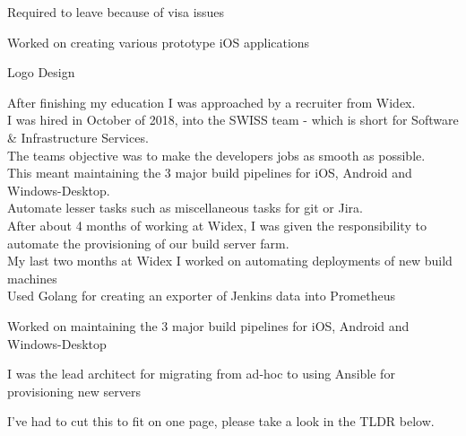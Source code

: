 \documentclass[]{cv}
\begin{document}
\begin{minipage}[t]{0.66\textwidth}
\vspace{\topsep} %
\begin{tightemize}
	\item Required to leave because of visa issues
	\item Worked on creating various prototype iOS applications
	\item Logo Design
\end{tightemize}
\sectionsep


After finishing my education I was approached by a recruiter from Widex. \\
I was hired in October of 2018, into the SWISS team - which is short for Software \& Infrastructure Services. \\
The teams objective was to make the developers jobs as smooth as possible. \\
This meant maintaining the 3 major build pipelines for iOS, Android and Windows-Desktop. \\
Automate lesser tasks such as miscellaneous tasks for git or Jira. \\
After about 4 months of working at Widex, I was given the responsibility to automate the provisioning of our build server farm. \\
My last two months at Widex I worked on automating deployments of new build machines \\
Used Golang for creating an exporter of Jenkins data into Prometheus

\begin{tightemize}
	\item Worked on maintaining the 3 major build pipelines for iOS, Android and	Windows-Desktop
	\item I was the lead architect for migrating from ad-hoc to using Ansible for provisioning new servers
\end{tightemize}
\sectionsep

\newpage


I've had to cut this to fit on one page, please take a look in the TLDR below.


\end{minipage}
\end{document}
